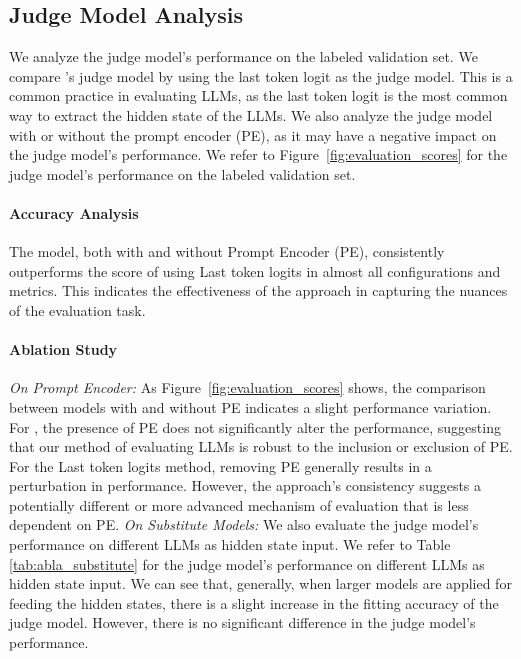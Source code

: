 
\subsection{Judge Model Analysis}
\label{app:judge_model}
We analyze the judge model's performance on the labeled validation set. 
We compare \GraphEval{}'s judge model by using the last token logit as the judge model. This is a common practice in evaluating LLMs, as the last token logit is the most common way to extract the hidden state of the LLMs. We also analyze the judge model with or without the prompt encoder (PE), as it may have a negative impact on the judge model's performance. We refer to Figure~\ref{fig:evaluation_scores} for the judge model's performance on the labeled validation set. 







 \paragraph{Accuracy Analysis}
 The  \GraphEval{} model, both with and without Prompt Encoder (PE), consistently outperforms the score of using Last token logits in almost all configurations and metrics. This indicates the effectiveness of the  \GraphEval{} approach in capturing the nuances of the evaluation task.

 \paragraph{Ablation Study}
{\it On Prompt Encoder:}
As Figure~\ref{fig:evaluation_scores} shows, 
the comparison between models with and without PE indicates a slight performance variation. For \GraphEval{}, the presence of PE does not significantly alter the performance, suggesting that our method of evaluating LLMs is robust to the inclusion or exclusion of PE.
For the Last token logits method, removing PE generally results in a perturbation in performance. However, the  \GraphEval{} approach's consistency suggests a potentially different or more advanced mechanism of evaluation that is less dependent on PE.
{\it On Substitute Models:}
We also evaluate the judge model's performance on different LLMs as hidden state input. 
We refer to Table \ref{tab:abla_substitute} for the judge model's performance on different LLMs as hidden state input. We can see that, generally, when larger models are applied for feeding the hidden states, there is a slight increase in the fitting accuracy of the judge model. However, there is no significant difference in the judge model's performance.



